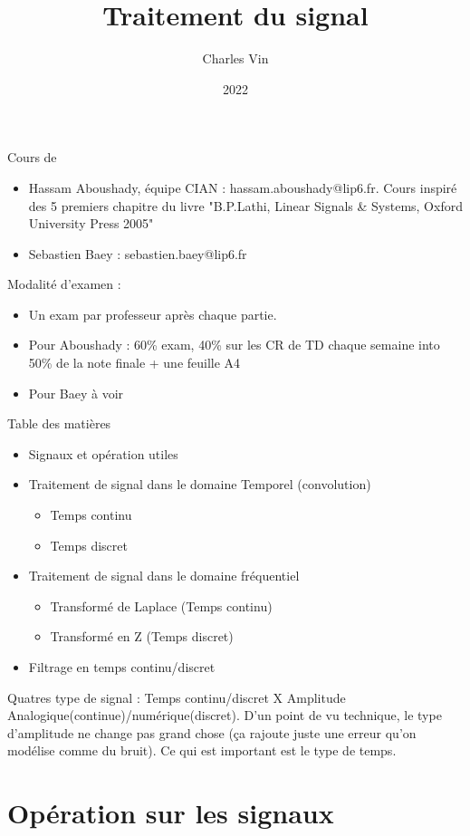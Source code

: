\documentclass{article}
\title{Traitement du signal}
\author{Charles Vin}
\date{2022}
\theoremstyle{plain}%
\theoremstyle{definition}
\theoremstyle{remark}
\begin{document}
\maketitle

Cours de \begin{itemize}
    \item Hassam Aboushady, équipe CIAN : hassam.aboushady@lip6.fr. Cours inspiré des 5 premiers chapitre du livre "B.P.Lathi, Linear Signals \& Systems, Oxford University Press 2005" 
    \item Sebastien Baey : sebastien.baey@lip6.fr
\end{itemize}

Modalité d'examen : 
\begin{itemize}
    \item Un exam par professeur après chaque partie. 
    \item Pour Aboushady : 60\% exam, 40\% sur les CR de TD chaque semaine into 50\% de la note finale + une feuille A4
    \item Pour Baey à voir
\end{itemize}

Table des matières 
\begin{itemize}
    \item Signaux et opération utiles
    \item Traitement de signal dans le domaine Temporel (convolution) \begin{itemize}
        \item Temps continu
        \item Temps discret
    \end{itemize}
    \item Traitement de signal dans le domaine fréquentiel \begin{itemize}
        \item Transformé de Laplace (Temps continu)
        \item Transformé en Z (Temps discret)
    \end{itemize}
    \item Filtrage en temps continu/discret
\end{itemize}

Quatres type de signal : Temps continu/discret X Amplitude Analogique(continue)/numérique(discret). D'un point de vu technique, le type d'amplitude ne change pas grand chose (ça rajoute juste une erreur qu'on modélise comme du bruit). Ce qui est important est le type de temps.

\section{Opération sur les signaux}
\end{document}
